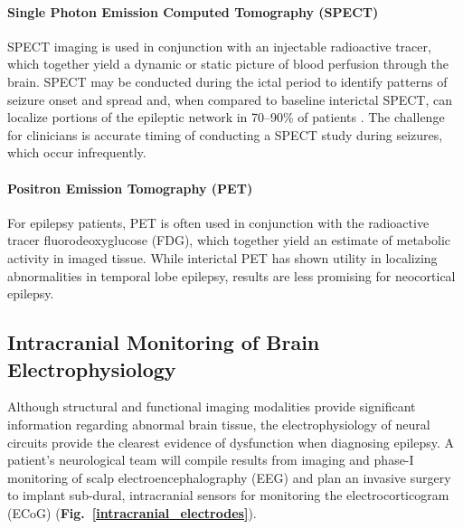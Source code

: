 \paragraph{Single Photon Emission Computed Tomography (SPECT)}
SPECT imaging is used in conjunction with an injectable radioactive tracer, which together yield a dynamic or static picture of blood perfusion through the brain. SPECT may be conducted during the ictal period to identify patterns of seizure onset and spread and, when compared to baseline interictal SPECT, can localize portions of the epileptic network in 70--90\% of patients \cite{kuzniecky2002neuroimaging}. The challenge for clinicians is accurate timing of conducting a SPECT study during seizures, which occur infrequently.

\paragraph{Positron Emission Tomography (PET)}
For epilepsy patients, PET is often used in conjunction with the radioactive tracer fluorodeoxyglucose (FDG), which together yield an estimate of metabolic activity in imaged tissue. While interictal PET has shown utility in localizing abnormalities in temporal lobe epilepsy, results are less promising for neocortical epilepsy. 

\subsection{Intracranial Monitoring of Brain Electrophysiology}
Although structural and functional imaging modalities provide significant information regarding abnormal brain tissue, the electrophysiology of neural circuits provide the clearest evidence of dysfunction when diagnosing epilepsy. A patient's neurological team will compile results from imaging and phase-I monitoring of scalp electroencephalography (EEG) and plan an invasive surgery to implant sub-dural, intracranial sensors for monitoring the electrocorticogram (ECoG) (\textbf{Fig.~\ref{intracranial_electrodes}}).  


